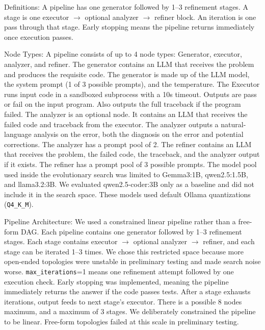 \documentclass{article}
\begin{document}
Definitions: A pipeline has one generator followed by 1--3 refinement stages. A stage is one executor $\rightarrow$ optional analyzer $\rightarrow$ refiner block. An iteration is one pass through that stage. Early stopping means the pipeline returns immediately once execution passes.

Node Types:
A pipeline consists of up to 4 node types: Generator, executor, analyzer, and refiner. The generator contains an LLM that receives the problem and produces the requisite code. The generator is made up of the LLM model, the system prompt (1 of 3 possible prompts), and the temperature. The Executor runs input code in a sandboxed subprocess with a 10s timeout. Outputs are pass or fail on the input program. Also outputs the full traceback if the program failed. The analyzer is an optional node. It contains an LLM that receives the failed code and traceback from the executor. The analyzer outputs a natural-language analysis on the error, both the diagnosis on the error and potential corrections. The analyzer has a prompt pool of 2. The refiner contains an LLM that receives the problem, the failed code, the traceback, and the analyzer output if it exists. The refiner has a prompt pool of 3 possible prompts. The model pool used inside the evolutionary search was limited to Gemma3:1B, qwen2.5:1.5B, and llama3.2:3B. We evaluated qwen2.5-coder:3B only as a baseline and did not include it in the search space. These models used default Ollama quantizations (\texttt{Q4\_K\_M}).

Pipeline Architecture:
We used a constrained linear pipeline rather than a free-form DAG. Each pipeline contains one generator followed by 1--3 refinement stages. Each stage contains executor $\rightarrow$ optional analyzer $\rightarrow$ refiner, and each stage can be iterated 1--3 times. We chose this restricted space because more open-ended topologies were unstable in preliminary testing and made search noise worse. \texttt{max\_iterations}=1 means one refinement attempt followed by one execution check. Early stopping was implemented, meaning the pipeline immediately returns the answer if the code passes tests. After a stage exhausts iterations, output feeds to next stage's executor. There is a possible 8 nodes maximum, and a maximum of 3 stages. We deliberately constrained the pipeline to be linear. Free-form topologies failed at this scale in preliminary testing.
\end{document}
